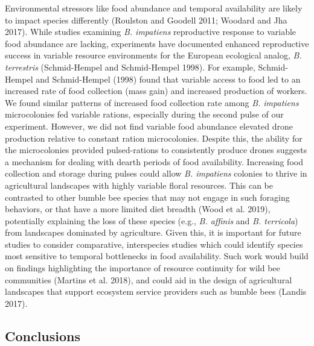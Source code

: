 \documentclass[11pt,]{article}
\begin{document}
Environmental stressors like food abundance and temporal availability
are likely to impact species differently (Roulston and Goodell 2011;
Woodard and Jha 2017). While studies examining \emph{B. impatiens}
reproductive response to variable food abundance are lacking,
experiments have documented enhanced reproductive success in variable
resource environments for the European ecological analog, \emph{B.
terrestris} (Schmid-Hempel and Schmid-Hempel 1998). For example,
Schmid-Hempel and Schmid-Hempel (1998) found that variable access to
food led to an increased rate of food collection (mass gain) and
increased production of workers. We found similar patterns of increased
food collection rate among \emph{B. impatiens} microcolonies fed
variable rations, especially during the second pulse of our experiment.
However, we did not find variable food abundance elevated drone
production relative to constant ration microcolonies. Despite this, the
ability for the microcolonies provided pulsed-rations to consistently
produce drones suggests a mechanism for dealing with dearth periods of
food availability. Increasing food collection and storage during pulses
could allow \emph{B. impatiens} colonies to thrive in agricultural
landscapes with highly variable floral resources. This can be contrasted
to other bumble bee species that may not engage in such foraging
behaviors, or that have a more limited diet breadth (Wood et al. 2019),
potentially explaining the loss of these species (e.g., \emph{B.
affinis} and \emph{B. terricola}) from landscapes dominated by
agriculture. Given this, it is important for future studies to consider
comparative, interspecies studies which could identify species most
sensitive to temporal bottlenecks in food availability. Such work would
build on findings highlighting the importance of resource continuity for
wild bee communities (Martins et al. 2018), and could aid in the design
of agricultural landscapes that support ecosystem service providers such
as bumble bees (Landis 2017).

\hypertarget{conclusions}{%
\subsection{Conclusions}\label{conclusions}}
\end{document}
